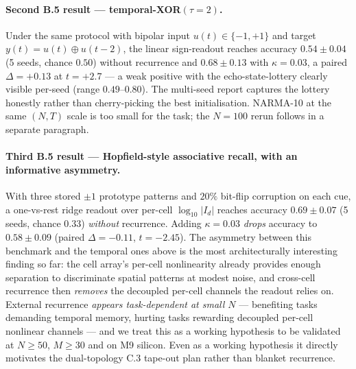 \documentclass[fontsize=10pt]{article}
\begin{document}
\paragraph{Second B.5 result --- temporal-XOR$(\tau=2)$.}
Under the same protocol with bipolar input $u(t) \in \{-1, +1\}$ and target
$y(t) = u(t) \oplus u(t-2)$, the linear sign-readout reaches accuracy
$0.54 \pm 0.04$ (5 seeds, chance $0.50$) without recurrence and
$\mathbf{0.68 \pm 0.13}$ with $\kappa=0.03$, a paired $\Delta = +0.13$ at
$t = +2.7$ --- a weak positive with the echo-state-lottery clearly visible
per-seed (range $0.49$--$0.80$). The multi-seed report captures the lottery
honestly rather than cherry-picking the best initialisation. NARMA-10 at the
same $(N, T)$ scale is too small for the task; the $N=100$ rerun follows in
a separate paragraph.

\paragraph{Third B.5 result --- Hopfield-style associative recall, with an informative asymmetry.}
With three stored $\pm 1$ prototype patterns and $20\%$ bit-flip corruption on
each cue, a one-vs-rest ridge readout over per-cell $\log_{10}|I_d|$ reaches
accuracy $\mathbf{0.69 \pm 0.07}$ (5 seeds, chance $0.33$) \emph{without} recurrence.
Adding $\kappa=0.03$ \emph{drops} accuracy to $0.58 \pm 0.09$ (paired
$\Delta = -0.11$, $t = -2.45$). The asymmetry between this benchmark and the
temporal ones above is the most architecturally interesting finding so far:
the cell array's per-cell nonlinearity already provides enough separation to
discriminate spatial patterns at modest noise, and cross-cell recurrence then
\emph{removes} the decoupled per-cell channels the readout relies on. External
recurrence \emph{appears task-dependent at small $N$} --- benefiting tasks
demanding temporal memory, hurting tasks rewarding decoupled per-cell
nonlinear channels --- and we treat this as a working hypothesis to be
validated at $N{\geq}50$, $M{\geq}30$ and on M9 silicon. Even as a working
hypothesis it directly motivates the dual-topology C.3 tape-out plan rather
than blanket recurrence.
\end{document}
